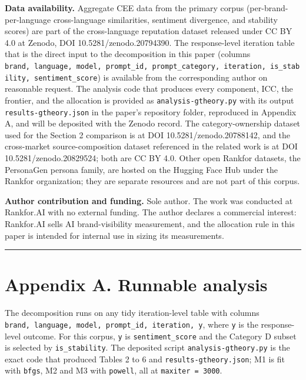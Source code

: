\documentclass[pdflatex,sn-mathphys-num]{sn-jnl}
\begin{document}
\textbf{Data availability.} Aggregate CEE data from the primary corpus (per-brand-per-language cross-language similarities, sentiment divergence, and stability scores) are part of the cross-language reputation dataset released under CC BY 4.0 at Zenodo, DOI 10.5281/zenodo.20794390. The response-level iteration table that is the direct input to the decomposition in this paper (columns \texttt{brand,\ language,\ model,\ prompt\_id,\ prompt\_category,\ iteration,\ is\_stability,\ sentiment\_score}) is available from the corresponding author on reasonable request. The analysis code that produces every component, ICC, the frontier, and the allocation is provided as \texttt{analysis-gtheory.py} with its output \texttt{results-gtheory.json} in the paper's repository folder, reproduced in Appendix A, and will be deposited with the Zenodo record. The category-ownership dataset used for the Section 2 comparison is at DOI 10.5281/zenodo.20788142, and the cross-market source-composition dataset referenced in the related work is at DOI 10.5281/zenodo.20829524; both are CC BY 4.0. Other open Rankfor datasets, the PersonaGen persona family, are hosted on the Hugging Face Hub under the Rankfor organization; they are separate resources and are not part of this corpus.

\textbf{Author contribution and funding.} Sole author. The work was conducted at Rankfor.AI with no external funding. The author declares a commercial interest: Rankfor.AI sells AI brand-visibility measurement, and the allocation rule in this paper is intended for internal use in sizing its measurements.

\begin{center}\rule{0.5\linewidth}{0.5pt}\end{center}

\section*{Appendix A. Runnable analysis}\label{appendix-a.-runnable-analysis}

The decomposition runs on any tidy iteration-level table with columns \texttt{brand,\ language,\ model,\ prompt\_id,\ iteration,\ y}, where \texttt{y} is the response-level outcome. For this corpus, \texttt{y} is \texttt{sentiment\_score} and the Category D subset is selected by \texttt{is\_stability}. The deposited script \texttt{analysis-gtheory.py} is the exact code that produced Tables 2 to 6 and \texttt{results-gtheory.json}; M1 is fit with \texttt{bfgs}, M2 and M3 with \texttt{powell}, all at \texttt{maxiter\ =\ 3000}.
\end{document}
